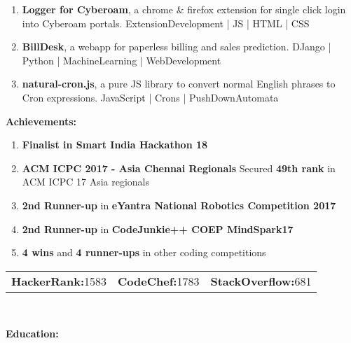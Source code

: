 \documentclass[a4paper,11pt]{article}
\begin{document}
\begin{center}
\begin{minipage}[t]{0.6\textwidth}
\begin{LARGE}
{\begin{enumerate}
						JavaFX | SocketProgramming
						\item \textbf{Logger for Cyberoam}, a chrome \& firefox extension for single click login into Cyberoam portals.\linebreak
						ExtensionDevelopment | JS | HTML | CSS
						\item \textbf{BillDesk}, a webapp for paperless billing and sales prediction.\linebreak
						DJango | Python | MachineLearning | WebDevelopment
						\item \textbf{natural-cron.js}, a pure JS library to convert normal English phrases to Cron expressions.\linebreak
						JavaScript | Crons | PushDownAutomata
					\end{enumerate}
				}
			\end{LARGE}
			\vspace{0.65cm}
            \begin{LARGE}
				\textbf{Achievements:}\medskip%
				{\small
					\begin{enumerate}
						\item \textbf{Finalist in Smart India Hackathon 18}
						\item \textbf{ACM ICPC 2017 - Asia Chennai Regionals}\linebreak
						Secured \textbf{49th rank} in ACM ICPC 17 Asia regionals
						\item \textbf{2nd Runner-up} in \textbf{eYantra National Robotics Competition 2017}
						\item \textbf{2nd Runner-up} in \textbf{CodeJunkie++ COEP MindSpark17}
						\item \textbf{4 wins} and \textbf{4 runner-ups} in other coding competitions
					\end{enumerate}
				}
			\end{LARGE}
			\vspace{0.35cm}
			\begin{normalsize}
				\begin{tabu} to \textwidth {X[l]X[c]X[r]}
					\textbf{HackerRank:}1583 & \textbf{CodeChef:}1783 & \textbf{StackOverflow:}681
				\end{tabu}
			\end{normalsize}
			\\
			\vspace{0.7cm}
            \begin{LARGE}
				\textbf{Education:}
				\medskip\linebreak%

\end{LARGE}
\end{minipage}
\end{center}
\end{document}
